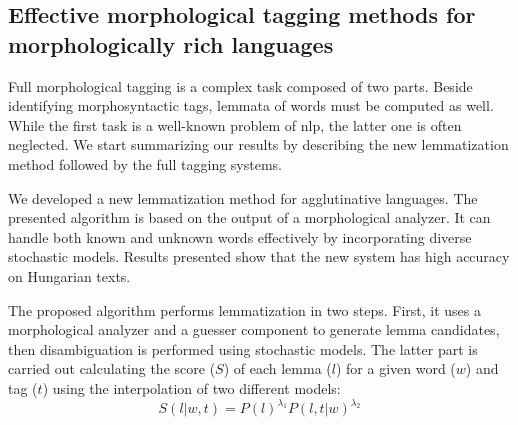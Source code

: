 \let\oldthesubsection=\thesubsection
\renewcommand{\thesubsection}{\Roman{subsection}}

%
%

\subsection{Effective morphological tagging methods for morphologically rich languages} %
\label{thes:morf}

Full morphological tagging is a complex task composed of two parts. 
Beside identifying morphosyntactic tags, lemmata of words must be computed as well.
While the first task is a well-known problem of \acrlong{nlp}, the latter one is often neglected.
We start summarizing our results by describing the new lemmatization method followed by the full tagging systems. 


\begin{core}
\begin{thesis}\label{thes:morf-lemma}
We developed a new lemmatization method for agglutinative languages.
The presented algorithm is based on the output of a morphological analyzer. It can handle both known and unknown words effectively by incorporating diverse stochastic models. 
Results presented show that the new system has high accuracy on Hungarian texts.
\end{thesis} 

\begin{pub}
\cite{Orosz2011,Orosz2012,Orosz2012a,Orosz2013a}
\end{pub}
\end{core}

The proposed algorithm performs lemmatization in two steps. 
First, it uses a morphological analyzer and a guesser component to generate lemma candidates, then disambiguation is performed using stochastic models.
The latter part is carried out calculating the score ($S$) of each lemma ($l$) for a given word ($w$) and tag ($t$) using the interpolation of two different models:
\begin{equation} %
S(l|w,t) = P(l)^{\lambda_1} P(l,t|w)^{\lambda_2}
\end{equation}

